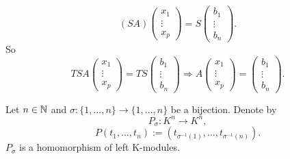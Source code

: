 \begin{proofenv}
     \begin{equation*}
        (SA)\begin{pmatrix}
        x_1\\
        \vdots\\
        x_p
        \end{pmatrix}=S\begin{pmatrix}
        b_1\\
        \vdots\\
        b_n
        \end{pmatrix}.
    \end{equation*}
    So 
     \begin{equation*}
        TSA\begin{pmatrix}
        x_1\\
        \vdots\\
        x_p
        \end{pmatrix}=TS\begin{pmatrix}
        b_1\\
        \vdots\\
        b_n
        \end{pmatrix}
        \Rightarrow
        A\begin{pmatrix}
        x_1\\        
        \vdots\\
        x_p
        \end{pmatrix}=\begin{pmatrix}
        b_1\\
        \vdots\\
        b_n
        \end{pmatrix}.
    \end{equation*}
\end{proofenv}
\begin{definitionenv}
    Let $n\in\mathbb{N}$ and $\sigma:\{1,\dots,n\}\rightarrow\{1,\dots,n\}$ be a bijection. Denote by 
    $$P_\sigma:K^n\longrightarrow K^n,$$
    $$P(t_1,\dots,t_n):=\left(t_{\sigma^{-1}(1)},\dots,t_{\sigma^{-1}(n)}\right).$$
    $P_\sigma$ is a homomorphism of left K-modules.
\end{definitionenv}
